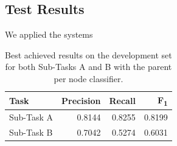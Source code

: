 \documentclass[11pt,a4paper]{article}
\begin{document}

\subsection{Test Results}

We applied the systems



\begin{table}[!h]
\begin{center}
\begin{tabular}{|l|r|r|r|}
\hline\centering\textbf{Task}  & \textbf{Precision} &  \textbf{Recall} &  \textbf{F\textsubscript{1}}\\
\hline
 Sub-Task A   &  0.8144 & 0.8255 & 0.8199 \\
 Sub-Task B   &  0.7042 & 0.5274 & 0.6031 \\
\hline
\end{tabular}
\end{center}
\caption{\label{devset-results} Best achieved results on the development set for both Sub-Tasks A and B with the parent per node classifier.}
\end{table}
\end{document}
